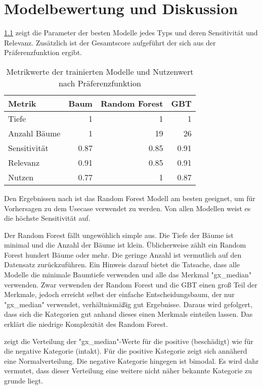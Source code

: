 \chapter{Modelbewertung und Diskussion}
\label{ch:modelbewertung}
\cref{tab:metrikwerte_der_trainierten_modelle} zeigt die Parameter der besten Modelle jedes Typs und deren Sensitivität und Relevanz. Zusätzlich ist der Gesamtscore aufgeführt der sich aus der Präferenzfunktion ergibt.

\begin{table}[ht]
	\raggedright
	\begin{tabularx}{\textwidth}{ | l | r | r | r|}
		\hline
		Metrik & Baum & Random Forest & GBT\\
		\hline
		Tiefe & 1 & 1 & 1\\
		Anzahl Bäume & 1 & 19 & 26\\
		Sensitivität & \num{0.87} & \num{0.85} & \num{0.91}\\
		Relevanz & \num{0.91} & \num{0.85} & \num{0.91}\\
		\hline
		\hline
		Nutzen & \num{0.77} & \num{1} & \num{0.87}\\
		\hline
	\end{tabularx}
	\caption{Metrikwerte der trainierten Modelle und Nutzenwert nach Präferenzfunktion}%
	\label{tab:metrikwerte_der_trainierten_modelle}	%
\end{table}


Den Ergebnissen nach ist das Random Forest Modell am besten geeignet, um für Vorhersagen zu dem Usecase verwendet zu werden. Von allen Modellen weist es die höchste Sensitivität auf. 

Der Random Forest fällt ungewöhlich simple aus. Die Tiefe der Bäume ist minimal und die Anzahl der Bäume ist klein. Üblicherweise zählt ein Random Forest hundert Bäume oder mehr. Die geringe Anzahl ist vermutlich auf den Datensatz zurückzuführen. Ein Hinweis darauf bietet die Tatsache, dass alle Modelle die minimale Baumtiefe verwenden und alle das Merkmal "gx\_median" verwenden. Zwar verwenden der Random Forest und die GBT einen groß Teil der Merkmale, jedoch erreicht selbst der einfache Entscheidungsbaum, der nur "gx\_median" verwendet, verhältnismäßig gut Ergebnisse. Daraus wird gefolgert, dass sich die Kategorien gut anhand dieses einen Merkmals einteilen lassen. Das erklärt die niedrige Komplexität des Random Forest.

 zeigt die Verteilung der "gx\_median"-Werte für die positive (beschädigt) wie für die negative Kategorie (intakt). Für die positive Kategorie zeigt sich annäherd eine Normalverteilung. Die negative Kategorie hingegen ist bimodal. Es wird dahr vermutet, dass dieser Verteilung eine weitere nicht näher bekannte Kategorie zu grunde liegt.

